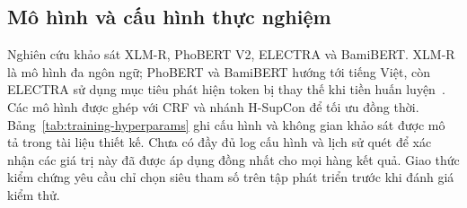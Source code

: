 \documentclass[conference,a4paper]{IEEEtran}
\begin{document}
\subsection{Mô hình và cấu hình thực nghiệm}\label{subsec:models}

Nghiên cứu khảo sát XLM-R, PhoBERT V2, ELECTRA và BamiBERT.
XLM-R là mô hình đa ngôn ngữ; PhoBERT và BamiBERT hướng tới tiếng Việt,
còn ELECTRA sử dụng mục tiêu phát hiện token bị thay thế khi tiền huấn
luyện~\cite{conneau2020xlmr,nguyen2020phobert,clark2020electra,nguyen2026bamibert}.
Các mô hình được ghép với CRF và nhánh H-SupCon để tối ưu đồng thời.
Bảng~\ref{tab:training-hyperparams} ghi cấu hình và không gian khảo sát
được mô tả trong tài liệu thiết kế. Chưa có đầy đủ log cấu hình và lịch
sử quét để xác nhận các giá trị này đã được áp dụng đồng nhất cho mọi
hàng kết quả. Giao thức kiểm chứng yêu cầu chỉ chọn siêu tham số trên
tập phát triển trước khi đánh giá kiểm thử.
\end{document}
